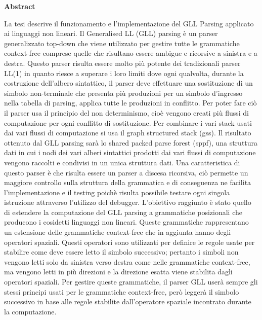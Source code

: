 \documentclass[12pt]{article}
\begin{document}
	\begin{center}
		{\huge\bf Abstract}\par
	\end{center}
	La tesi descrive il funzionamento e l'implementazione del GLL Parsing applicato ai linguaggi non lineari. Il Generalised LL (GLL) parsing è un parser generalizzato top-down che viene utilizzato per gestire tutte le grammatiche context-free comprese quelle che risultano essere ambigue e ricorsive a sinistra e a destra. Questo parser risulta essere molto più potente dei tradizionali parser LL(1) in quanto riesce a superare i loro limiti dove ogni qualvolta, durante la costruzione dell'albero sintattico, il parser deve effettuare una sostituzione di un simbolo non-terminale che presenta più produzioni per un simbolo d'ingresso nella tabella di parsing, applica tutte le produzioni in conflitto. Per poter fare ciò il parser usa il principio del non determinismo, cioè vengono creati più flussi di computazione per ogni conflitto di sostituzione. Per combinare i vari stack usati dai vari flussi di computazione si usa il graph structured stack (gss). Il risultato ottenuto dal GLL parsing sarà lo shared packed parse forest (sppf), una struttura dati in cui i nodi dei vari alberi sintattici prodotti dai vari flussi di computazione vengono raccolti e condivisi in un unica struttura dati. Una caratteristica di questo parser è che risulta essere un parser a discesa ricorsiva, ciò permette un maggiore controllo sulla struttura della grammatica e di conseguenza ne facilita l'implementazione e il testing poichè risulta possibile testare ogni singola istruzione attraverso l'utilizzo del debugger. L'obiettivo raggiunto è stato quello di estendere la computazione del GLL parsing a grammatiche posizionali che producono i cosidetti linguaggi non lineari. Queste grammatiche rappresentano un estensione delle grammatiche context-free che in aggiunta hanno degli operatori spaziali. Questi operatori sono utilizzati per definire le regole usate per stabilire come deve essere letto il simbolo successivo; pertanto i simboli non vengono letti solo da sinistra verso destra come nelle grammatiche context-free, ma vengono letti in più direzioni e la direzione esatta viene stabilita dagli operatori spaziali. Per gestire queste grammatiche, il parser GLL userà sempre gli stessi principi usati per le grammatiche context-free, però leggerà il simbolo successivo in base alle regole stabilite dall'operatore spaziale incontrato durante la computazione.
\end{document}
